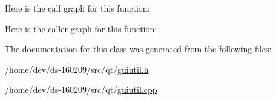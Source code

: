 Here is the call graph for this function\+:




Here is the caller graph for this function\+:




The documentation for this class was generated from the following files\+:\begin{DoxyCompactItemize}
\item 
/home/dev/ds-\/160209/src/qt/\hyperlink{guiutil_8h}{guiutil.\+h}\item 
/home/dev/ds-\/160209/src/qt/\hyperlink{guiutil_8cpp}{guiutil.\+cpp}\end{DoxyCompactItemize}
